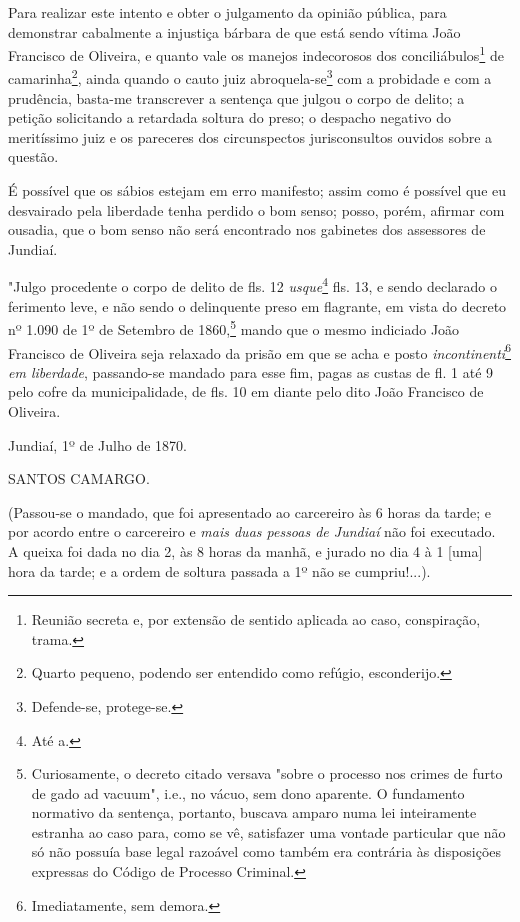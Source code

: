 Para realizar este intento e obter o julgamento da opinião pública, para
demonstrar cabalmente a injustiça bárbara de que está sendo vítima João
Francisco de Oliveira, e quanto vale os manejos indecorosos dos
conciliábulos\footnote{Reunião secreta e, por extensão de sentido
  aplicada ao caso, conspiração, trama.} de camarinha\footnote{Quarto
  pequeno, podendo ser entendido como refúgio, esconderijo.}, ainda
quando o cauto juiz abroquela-se\footnote{Defende-se, protege-se.} com
a probidade e com a prudência, basta-me transcrever a sentença que
julgou o corpo de delito; a petição solicitando a retardada soltura do
preso; o despacho negativo do meritíssimo juiz e os pareceres dos
circunspectos jurisconsultos ouvidos sobre a questão.

É possível que os sábios estejam em erro manifesto; assim como é
possível que eu desvairado pela liberdade tenha perdido o bom senso;
posso, porém, afirmar com ousadia, que o bom senso não será encontrado
nos gabinetes dos assessores de Jundiaí.

\asterisc

"Julgo procedente o corpo de delito de fls. 12 \emph{usque}\footnote{Até a.} fls. 13, e sendo declarado o ferimento leve, e não sendo o
delinquente preso em flagrante, em vista do decreto nº 1.090 de 1º de
Setembro de 1860,\footnote{Curiosamente, o decreto citado versava
  "sobre o processo nos crimes de furto de gado ad vacuum", i.e., no
  vácuo, sem dono aparente. O fundamento normativo da sentença,
  portanto, buscava amparo numa lei inteiramente estranha ao caso para,
  como se vê, satisfazer uma vontade particular que não só não possuía
  base legal razoável como também era contrária às disposições expressas
  do Código de Processo Criminal.} mando que o mesmo indiciado João
Francisco de Oliveira seja relaxado da prisão em que se acha e posto
\emph{incontinenti}\footnote{Imediatamente, sem demora.} \emph{em
liberdade}, passando-se mandado para esse fim, pagas as custas de fl. 1
até 9 pelo cofre da municipalidade, de fls. 10 em diante pelo dito João
Francisco de Oliveira.

Jundiaí, 1º de Julho de 1870.

SANTOS CAMARGO.

(Passou-se o mandado, que foi apresentado ao carcereiro às 6 horas da
tarde; e por acordo entre o carcereiro e \emph{mais duas pessoas de
Jundiaí} não foi executado.\\
A queixa foi dada no dia 2, às 8 horas da manhã, e jurado no dia 4 à 1
{[}uma{]} hora da tarde; e a ordem de soltura passada a 1º não se
cumpriu!...).

